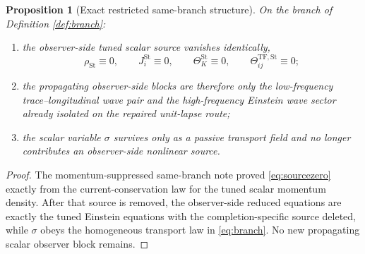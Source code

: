 \documentclass[11pt]{article}
\newtheorem{proposition}{Proposition}
\begin{document}
\begin{proposition}[Exact restricted same-branch structure]
\label{prop:restricted}
On the branch of Definition \ref{def:branch}:
\begin{enumerate}
    \item the observer-side tuned scalar source vanishes identically,
    \begin{equation}
    \rho_{\mathrm{St}}\equiv 0,
    \qquad
    J_i^{\mathrm{St}}\equiv 0,
    \qquad
    \Theta_K^{\mathrm{St}}\equiv 0,
    \qquad
    \Theta_{ij}^{\mathrm{TF,St}}\equiv 0;
    \label{eq:sourcezero}
    \end{equation}
    \item the propagating observer-side blocks are therefore only the low-frequency trace--longitudinal wave pair and the high-frequency Einstein wave sector already isolated on the repaired unit-lapse route;
    \item the scalar variable \(\sigma\) survives only as a passive transport field and no longer contributes an observer-side nonlinear source.
\end{enumerate}
\end{proposition}

\begin{proof}
The momentum-suppressed same-branch note proved \eqref{eq:sourcezero} exactly from the current-conservation law for the tuned scalar momentum density. After that source is removed, the observer-side reduced equations are exactly the tuned Einstein equations with the completion-specific source deleted, while \(\sigma\) obeys the homogeneous transport law in \eqref{eq:branch}. No new propagating scalar observer block remains.
\end{proof}
\end{document}

